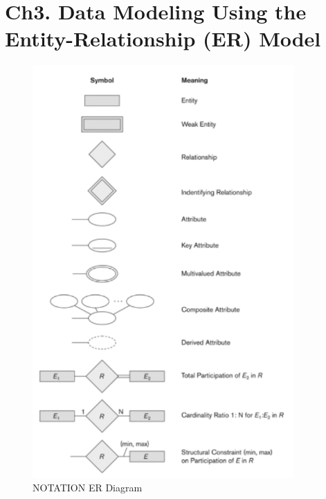 \newpage
\section{Ch3. Data Modeling Using the Entity-Relationship (ER) Model}
\begin{figure}[!h]
    \centering
    \includegraphics[width=10cm]{image/notation-er-diagrams.pdf}
    \caption{NOTATION ER Diagram}
\end{figure}

